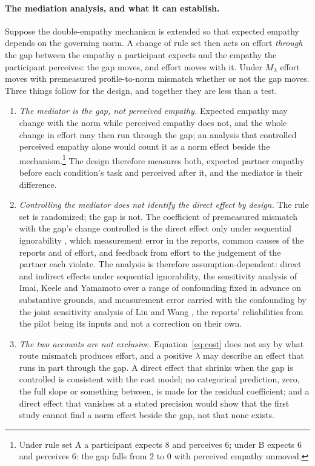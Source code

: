 \paragraph{The mediation analysis, and what it can establish.} Suppose the double-empathy mechanism is extended so that expected empathy depends on the governing norm. A change of rule set then acts on effort \emph{through} the gap between the empathy a participant expects and the empathy the participant perceives: the gap moves, and effort moves with it. Under $M_\lambda$ effort moves with premeasured profile-to-norm mismatch whether or not the gap moves. Three things follow for the design, and together they are less than a test.
\begin{enumerate}[label=(\roman*), leftmargin=*]
\item \emph{The mediator is the gap, not perceived empathy.} Expected empathy may change with the norm while perceived empathy does not, and the whole change in effort may then run through the gap; an analysis that controlled perceived empathy alone would count it as a norm effect beside the mechanism.\footnote{Under rule set A a participant expects $8$ and perceives $6$; under B expects $6$ and perceives $6$: the gap falls from $2$ to $0$ with perceived empathy unmoved.} The design therefore measures both, expected partner empathy before each condition's task and perceived after it, and the mediator is their difference.
\item \emph{Controlling the mediator does not identify the direct effect by design.} The rule set is randomized; the gap is not. The coefficient of premeasured mismatch with the gap's change controlled is the direct effect only under sequential ignorability \cite{ImaiKeeleTingley2010, ImaiKeeleYamamoto2010}, which measurement error in the reports, common causes of the reports and of effort, and feedback from effort to the judgement of the partner each violate. The analysis is therefore assumption-dependent: direct and indirect effects under sequential ignorability, the sensitivity analysis of Imai, Keele and Yamamoto \cite{ImaiKeeleYamamoto2010} over a range of confounding fixed in advance on substantive grounds, and measurement error carried with the confounding by the joint sensitivity analysis of Liu and Wang \cite{LiuWang2021}, the reports' reliabilities from the pilot being its inputs and not a correction on their own.
\item \emph{The two accounts are not exclusive.} Equation~\eqref{eq:cost} does not say by what route mismatch produces effort, and a positive $\lambda$ may describe an effect that runs in part through the gap. A direct effect that shrinks when the gap is controlled is consistent with the cost model; no categorical prediction, zero, the full slope or something between, is made for the residual coefficient; and a direct effect that vanishes at a stated precision would show that the first study cannot find a norm effect beside the gap, not that none exists.
\end{enumerate}
